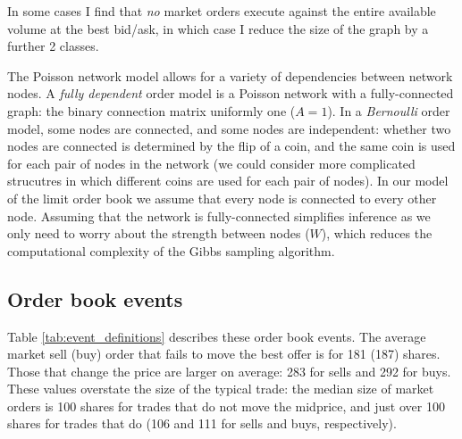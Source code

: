In some cases I find that \textit{no} market orders execute against the entire available volume at the best bid/ask, in which case I reduce the size of the graph by a further 2 classes.

The Poisson network model allows for a variety of dependencies between network nodes. A \textit{fully dependent} order model is a Poisson network with a fully-connected graph: the binary connection matrix uniformly one ($A = 1$). In a \textit{Bernoulli} order model, some nodes are connected, and some nodes are independent: whether two nodes are connected is determined by the flip of a coin, and the same coin is used for each pair of nodes in the network (we could consider more complicated strucutres in which different coins are used for each pair of nodes). In our model of the limit order book we assume that every node is connected to every other node. Assuming that the network is fully-connected simplifies inference as we only need to worry about the strength between nodes ($W$), which reduces the computational complexity of the Gibbs sampling algorithm.


\subsection{Order book events}
Table \ref{tab:event_definitions} describes these order book events. The average market sell (buy) order that fails to move the best offer is for 181 (187) shares. Those that change the price are larger on average: 283 for sells and 292 for buys. These values overstate the size of the typical trade: the median size of market orders is 100 shares for trades that do not move the midprice, and just over 100 shares for trades that do (106 and 111 for sells and buys, respectively).

